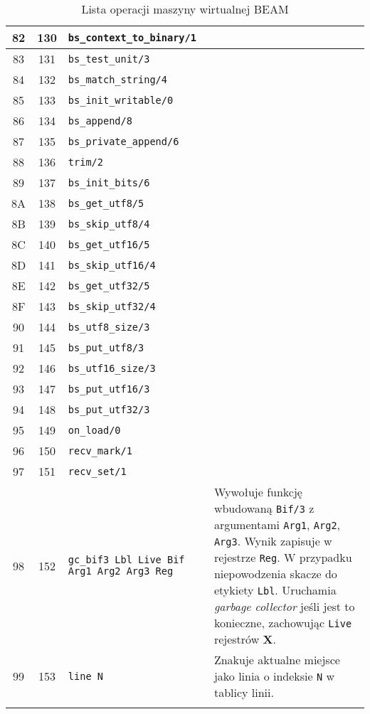 \begin{longtable}{|c|c|p{5cm}|p{7cm}|}
\hline
82 & 130 & \texttt{bs\_context\_to\_binary/1} & \\
\hline
83 & 131 & \texttt{bs\_test\_unit/3} & \\
\hline
84 & 132 & \texttt{bs\_match\_string/4} & \\
\hline
85 & 133 & \texttt{bs\_init\_writable/0} & \\
\hline
86 & 134 & \texttt{bs\_append/8} & \\
\hline
87 & 135 & \texttt{bs\_private\_append/6} & \\
\hline
88 & 136 & \texttt{trim/2} & \\
\hline
89 & 137 & \texttt{bs\_init\_bits/6} & \\
\hline
8A & 138 & \texttt{bs\_get\_utf8/5} & \\
\hline
8B & 139 & \texttt{bs\_skip\_utf8/4} & \\
\hline
8C & 140 & \texttt{bs\_get\_utf16/5} & \\
\hline
8D & 141 & \texttt{bs\_skip\_utf16/4} & \\
\hline
8E & 142 & \texttt{bs\_get\_utf32/5} & \\
\hline
8F & 143 & \texttt{bs\_skip\_utf32/4} & \\
\hline
90 & 144 & \texttt{bs\_utf8\_size/3} & \\
\hline
91 & 145 & \texttt{bs\_put\_utf8/3} & \\
\hline
92 & 146 & \texttt{bs\_utf16\_size/3} & \\
\hline
93 & 147 & \texttt{bs\_put\_utf16/3} & \\
\hline
94 & 148 & \texttt{bs\_put\_utf32/3} & \\
\hline
95 & 149 & \texttt{on\_load/0} & \\
\hline
96 & 150 & \texttt{recv\_mark/1} & \\
\hline
97 & 151 & \texttt{recv\_set/1} & \\
\hline
98 & 152 & \texttt{gc\_bif3 Lbl Live Bif Arg1 Arg2 Arg3 Reg} & Wywołuje funkcję wbudowaną \texttt{Bif/3} z argumentami \texttt{Arg1}, \texttt{Arg2}, \texttt{Arg3}. Wynik zapisuje w rejestrze \texttt{Reg}. W przypadku niepowodzenia skacze do etykiety \texttt{Lbl}. Uruchamia \emph{garbage collector} jeśli jest to konieczne, zachowując \texttt{Live} rejestrów \textbf{X}. \\
\hline
99 & 153 & \texttt{line N} & Znakuje aktualne miejsce jako linia o indeksie \texttt{N} w tablicy linii.\\
\hline


\caption{Lista operacji maszyny wirtualnej BEAM} 
\label{tab:ops} \\
\end{longtable}